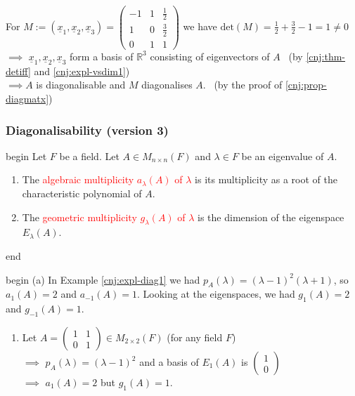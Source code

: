 \documentclass[
  12pt,
  a4paper,
  twoside]{article}
\providecommand{\tightlist}{%
  \setlength{\itemsep}{0pt}\setlength{\parskip}{0pt}}
\theoremstyle{plain}
\theoremstyle{definition}
\begin{document}
For \(M:=( \underline{x}_{1}, \underline{x}_{2}, \underline{x}_{3}) = \begin{pmatrix} -1 & 1 & \frac{1}{2} \\ 1 & 0 & \frac{3}{2} \\ 0 & 1 & 1 \end{pmatrix}\) we have
\(\mathrm{det}(M) = \frac{1}{2} + \frac{3}{2} - 1 = 1 \neq 0\)\\
\(\implies\) \(\underline{x}_{1}, \underline{x}_{2}, \underline{x}_{3}\) form a basis of \(\mathbb{R}^{3}\) consisting of eigenvectors of \(A\) \hfill~{(by \ref{cnj:thm-detiff} and \ref{cnj:expl-vsdim1})}\\
\(\implies A\) is diagonalisable and \(M\) diagonalises \(A\). \hfill~{(by the proof of \ref{cnj:prop-diagmatx})}

\hypertarget{sss-diag-v3}{%
\subsubsection{Diagonalisability (version 3)}\label{sss-diag-v3}}

\csname begin\label{cnj:defn-multiplicities}
Let \(F\) be a field. Let \(A \in M_{n \times n}(F)\) and \(\lambda \in F\) be an eigenvalue of \(A\).

\begin{enumerate}
\def\labelenumi{(\alph{enumi})}
\tightlist
\item
  The \textcolor{red}{algebraic multiplicity $a_{\lambda}(A)$ of $\lambda$} is its multiplicity as a root of the characteristic polynomial of \(A\).
\item
  The \textcolor{red}{geometric multiplicity $g_{\lambda}(A)$ of $\lambda$} is the dimension of the eigenspace \(E_{\lambda}(A)\).
\end{enumerate}

\csname end

\csname begin\label{cnj:expl-multiplicities}
(a) In Example \ref{cnj:expl-diag1} we had \(p_{A}(\lambda) = ( \lambda-1)^{2}( \lambda + 1)\), so \(a_{1}(A) = 2\) and \(a_{-1}(A)=1\). Looking at the eigenspaces, we had \(g_{1}(A)=2\) and \(g_{-1}(A) = 1\).

\begin{enumerate}
\def\labelenumi{(\alph{enumi})}
\setcounter{enumi}{1}
\tightlist
\item
  Let \(A = \begin{pmatrix} 1 & 1 \\ 0 & 1 \end{pmatrix} \in M_{2 \times 2}({F})\) (for any field \(F\))\\
  \(\implies\) \(p_{A}(\lambda) = (\lambda - 1)^{2}\) and a basis of \(E_{1}(A)\) is \(\begin{pmatrix} 1 \\ 0 \end{pmatrix}\)\\
  \(\implies\) \(a_{1}(A) = 2\) but \(g_{1}(A) = 1\).
\end{enumerate}
\end{document}
